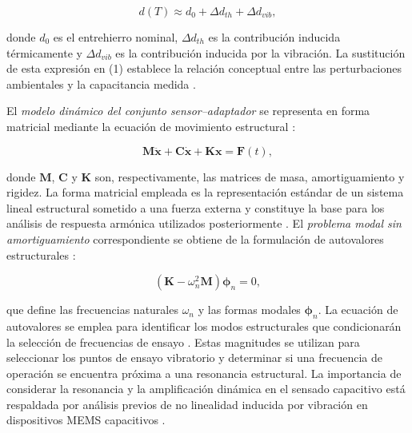 \documentclass[conference]{IEEEtran}
\begin{document}
\begin{equation}
 d(T)\approx d_0+\Delta d_{th}+\Delta d_{vib},
\label{eq:gap}
\end{equation}

donde $d_0$ es el entrehierro nominal, $\Delta d_{th}$ es la contribución inducida térmicamente y $\Delta d_{vib}$ es la contribución inducida por la vibración. La sustitución de esta expresión en (1) establece la relación conceptual entre las perturbaciones ambientales y la capacitancia medida \cite{Hao2012,Zhang2024}.

El \textit{modelo dinámico del conjunto sensor--adaptador} se representa en forma matricial mediante la ecuación de movimiento estructural \cite{Zhang2024,Davarnia2025}:

\begin{equation}
\mathbf{M}\ddot{\mathbf{x}}+\mathbf{C}\dot{\mathbf{x}}+\mathbf{K}\mathbf{x}=\mathbf{F}(t),
\label{eq:dynamic}
\end{equation}

donde $\mathbf{M}$, $\mathbf{C}$ y $\mathbf{K}$ son, respectivamente, las matrices de masa, amortiguamiento y rigidez. La forma matricial empleada es la representación estándar de un sistema lineal estructural sometido a una fuerza externa y constituye la base para los análisis de respuesta armónica utilizados posteriormente \cite{Zhang2024,Davarnia2025}. El \textit{problema modal sin amortiguamiento} correspondiente se obtiene de la formulación de autovalores estructurales \cite{Zhang2024,Zaitsev2022}:

\begin{equation}
\left(\mathbf{K}-\omega_n^2\mathbf{M}\right)\boldsymbol{\phi}_n=0,
\label{eq:modal}
\end{equation}

que define las frecuencias naturales $\omega_n$ y las formas modales $\boldsymbol{\phi}_n$. La ecuación de autovalores se emplea para identificar los modos estructurales que condicionarán la selección de frecuencias de ensayo \cite{Zhang2024,Zaitsev2022}. Estas magnitudes se utilizan para seleccionar los puntos de ensayo vibratorio y determinar si una frecuencia de operación se encuentra próxima a una resonancia estructural. La importancia de considerar la resonancia y la amplificación dinámica en el sensado capacitivo está respaldada por análisis previos de no linealidad inducida por vibración en dispositivos MEMS capacitivos \cite{Zhang2024}.
\end{document}
